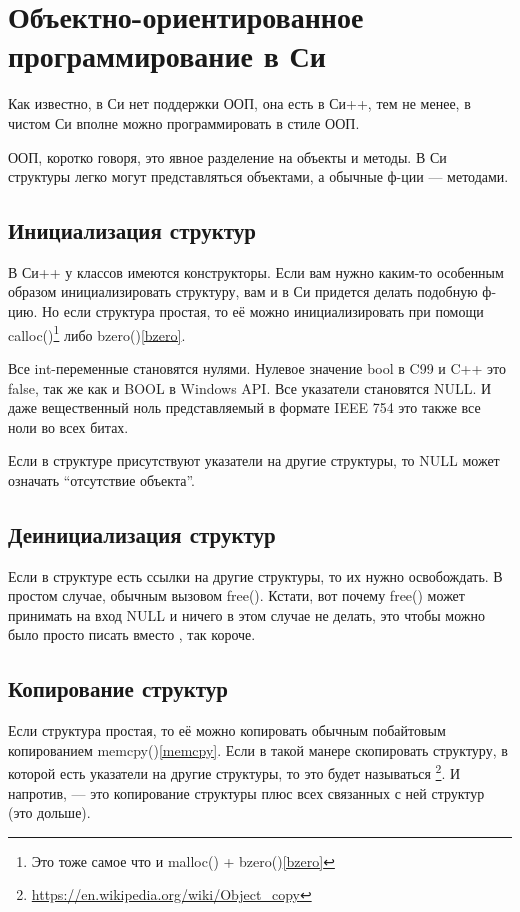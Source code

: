 \chapter{Объектно-ориентированное программирование в Си}

Как известно, в Си нет поддержки ООП, она есть в Си++, тем не менее, в чистом Си вполне
можно программировать в стиле ООП.

ООП, коротко говоря, это явное разделение на объекты и методы. 
В Си структуры легко могут представляться объектами, а обычные ф-ции --- методами.

\section{Инициализация структур}

В Си++ у классов имеются конструкторы. Если вам нужно каким-то особенным образом инициализировать
структуру, вам и в Си придется делать подобную ф-цию. Но если структура простая, то её можно
инициализировать при помощи calloc()\footnote{Это тоже самое что и malloc() + bzero()\ref{bzero}} 
либо bzero()\ref{bzero}.

Все int-переменные становятся нулями. Нулевое значение bool в C99 и C++ это false, 
так же как и BOOL в Windows API. Все указатели становятся NULL. И даже вещественный
ноль представляемый в формате IEEE 754 это также все ноли во всех битах.

Если в структуре присутствуют указатели на другие структуры, то NULL может означать ``отсутствие объекта''.

\section{Деинициализация структур}

Если в структуре есть ссылки на другие структуры, то их нужно освобождать. В простом случае,
обычным вызовом free(). Кстати, вот почему free() может принимать на вход NULL и ничего в этом случае
не делать, это чтобы можно было просто писать  вместо 
, так короче.

\section{Копирование структур}

Если структура простая, то её можно копировать обычным побайтовым копированием memcpy()\ref{memcpy}.
Если в такой манере скопировать структуру, в которой есть указатели на другие структуры,
то это будет называться \footnote{\url{https://en.wikipedia.org/wiki/Object_copy}}. 
И напротив,  --- это копирование структуры
плюс всех связанных с ней структур (это дольше).

